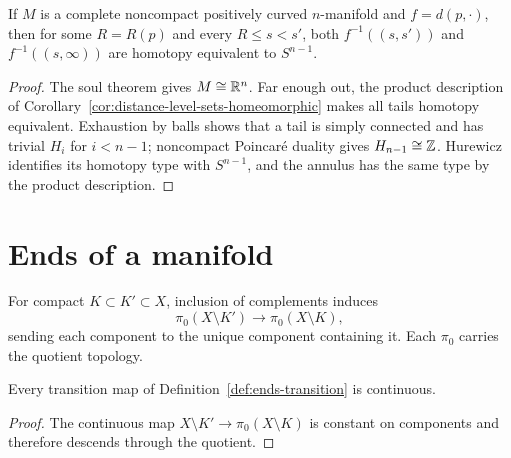 \begin{corollary}
\label{cor:distance-annuli-homotopy-sphere}
\label{htpytype}

If $M$ is a complete noncompact positively curved $n$-manifold and
$f=d(p,\cdot)$, then for some $R=R(p)$ and every $R\le s<s'$, both
$f^{-1}((s,s'))$ and $f^{-1}((s,\infty))$ are homotopy equivalent to
$S^{n-1}$.
\end{corollary}
\begin{proof}
\sketch
{}
The soul theorem gives $M\cong\mathbb{R}^n$. Far enough out, the product
description of Corollary~\ref{cor:distance-level-sets-homeomorphic}
makes all tails homotopy equivalent. Exhaustion by balls shows that a
tail is simply connected and has trivial $H_i$ for $i<n-1$; noncompact
Poincar\'e duality gives $H_{n-1}\cong\mathbb{Z}$. Hurewicz identifies its
homotopy type with $S^{n-1}$, and the annulus has the same type by the
product description.
\end{proof}

\section{Ends of a manifold}
\label{ENDS}

\begin{definition}
\label{def:ends-transition}





For compact $K\subset K'\subset X$, inclusion of complements induces
$$\pi_0(X\setminus K')\longrightarrow\pi_0(X\setminus K),$$
sending each component to the unique component containing it. Each
$\pi_0$ carries the quotient topology.
\end{definition}

\begin{lemma}
\label{lem:ends-transition-continuous}





Every transition map of Definition~\ref{def:ends-transition} is
continuous.
\end{lemma}
\begin{proof}
\sketch

The continuous map $X\setminus K'\to\pi_0(X\setminus K)$ is constant
on components and therefore descends through the quotient.
\end{proof}

